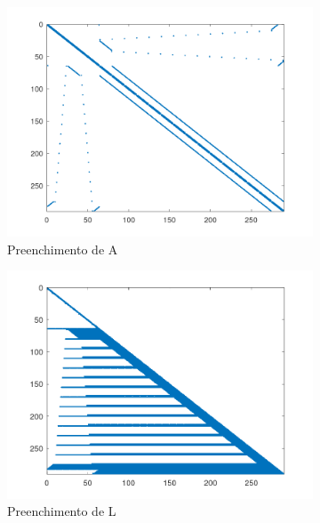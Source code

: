 \documentclass{article}
\begin{document}
\begin{figure}[H]
    \centering
    \begin{subfigure}[b]{0.3\textwidth}
         \centering
         \includegraphics[width=\textwidth]{image/mesh3e1_spyA.png}
         \caption{Preenchimento de A}
         \label{fig:mesh-spyA}
    \end{subfigure}
    \hfill
    \begin{subfigure}[b]{0.3\textwidth}
         \centering
         \includegraphics[width=\textwidth]{image/mesh3e1_spyL.png}
         \caption{Preenchimento de L}
         \label{fig:mesh-spyL}
    \end{subfigure}
    \hfill
    \begin{subfigure}[b]{0.3\textwidth}

\end{subfigure}
\end{figure}
\end{document}
